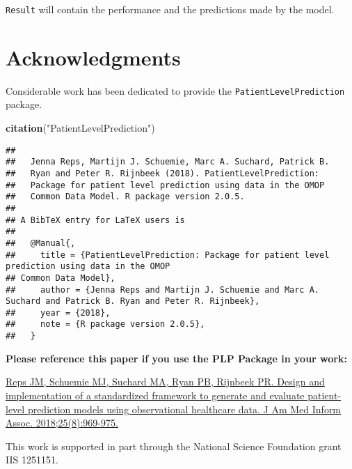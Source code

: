 \documentclass[]{article}
\newenvironment{Shaded}{\begin{snugshade}}{\end{snugshade}}
\newcommand{\KeywordTok}[1]{\textcolor[rgb]{0.13,0.29,0.53}{\textbf{#1}}}
\newcommand{\StringTok}[1]{\textcolor[rgb]{0.31,0.60,0.02}{#1}}
\newcommand{\NormalTok}[1]{#1}
\begin{document}
\texttt{Result} will contain the performance and the predictions made by
the model.

\section{Acknowledgments}\label{acknowledgments}

Considerable work has been dedicated to provide the
\texttt{PatientLevelPrediction} package.

\begin{Shaded}
\begin{Highlighting}[]
\KeywordTok{citation}\NormalTok{(}\StringTok{"PatientLevelPrediction"}\NormalTok{)}
\end{Highlighting}
\end{Shaded}

\begin{verbatim}
## 
##   Jenna Reps, Martijn J. Schuemie, Marc A. Suchard, Patrick B.
##   Ryan and Peter R. Rijnbeek (2018). PatientLevelPrediction:
##   Package for patient level prediction using data in the OMOP
##   Common Data Model. R package version 2.0.5.
## 
## A BibTeX entry for LaTeX users is
## 
##   @Manual{,
##     title = {PatientLevelPrediction: Package for patient level prediction using data in the OMOP
## Common Data Model},
##     author = {Jenna Reps and Martijn J. Schuemie and Marc A. Suchard and Patrick B. Ryan and Peter R. Rijnbeek},
##     year = {2018},
##     note = {R package version 2.0.5},
##   }
\end{verbatim}

\textbf{Please reference this paper if you use the PLP Package in your
work:}

\href{http://dx.doi.org/10.1093/jamia/ocy032}{Reps JM, Schuemie MJ,
Suchard MA, Ryan PB, Rijnbeek PR. Design and implementation of a
standardized framework to generate and evaluate patient-level prediction
models using observational healthcare data. J Am Med Inform Assoc.
2018;25(8):969-975.}

This work is supported in part through the National Science Foundation
grant IIS 1251151.
\end{document}
